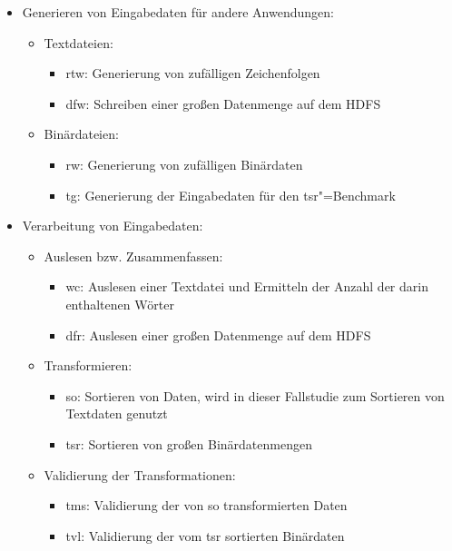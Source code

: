 \begin{itemize}
    \item Generieren von Eingabedaten für andere Anwendungen:
    \begin{itemize}
        \item Textdateien:
        \begin{itemize}
            \item \gls{rtw}: Generierung von zufälligen Zeichenfolgen
            \item \gls{dfw}: Schreiben einer großen Datenmenge auf dem \gls{HDFS}
        \end{itemize}
        \item Binärdateien:
        \begin{itemize}
            \item \gls{rw}: Generierung von zufälligen Binärdaten
            \item \gls{tg}: Generierung der Eingabedaten für den \acrlong{tsr}"=Benchmark
       \end{itemize}
    \end{itemize}

    \item Verarbeitung von Eingabedaten:
    \begin{itemize}
        \item Auslesen bzw. Zusammenfassen:
        \begin{itemize}
            \item \gls{wc}: Auslesen einer Textdatei und Ermitteln der Anzahl der darin enthaltenen Wörter
            \item \gls{dfr}: Auslesen einer großen Datenmenge auf dem \gls{HDFS}
        \end{itemize}
        \item Transformieren:
        \begin{itemize}
            \item \gls{so}: Sortieren von Daten, wird in dieser Fallstudie zum Sortieren von Textdaten genutzt
            \item \gls{tsr}: Sortieren von großen Binärdatenmengen
        \end{itemize}
        \item Validierung der Transformationen:
        \begin{itemize}
            \item \gls{tms}: Validierung der von \acrlong{so} transformierten Daten
            \item \gls{tvl}: Validierung der vom \acrlong{tsr} sortierten Binärdaten
        \end{itemize}
    \end{itemize}


\end{itemize}
